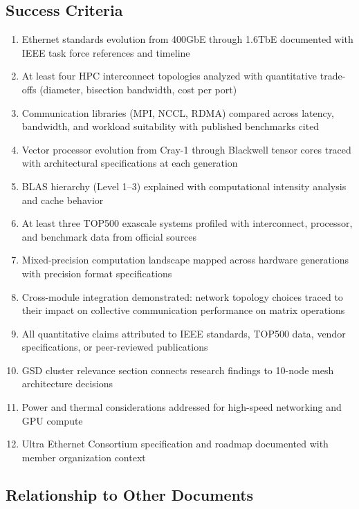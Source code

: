 \documentclass[11pt,letterpaper]{article}
\begin{document}
\subsection{Success Criteria}

\begin{enumerate}[leftmargin=2em]
\item Ethernet standards evolution from 400GbE through 1.6TbE documented with IEEE task force references and timeline
\item At least four HPC interconnect topologies analyzed with quantitative trade-offs (diameter, bisection bandwidth, cost per port)
\item Communication libraries (MPI, NCCL, RDMA) compared across latency, bandwidth, and workload suitability with published benchmarks cited
\item Vector processor evolution from Cray-1 through Blackwell tensor cores traced with architectural specifications at each generation
\item BLAS hierarchy (Level 1--3) explained with computational intensity analysis and cache behavior
\item At least three TOP500 exascale systems profiled with interconnect, processor, and benchmark data from official sources
\item Mixed-precision computation landscape mapped across hardware generations with precision format specifications
\item Cross-module integration demonstrated: network topology choices traced to their impact on collective communication performance on matrix operations
\item All quantitative claims attributed to IEEE standards, TOP500 data, vendor specifications, or peer-reviewed publications
\item GSD cluster relevance section connects research findings to 10-node mesh architecture decisions
\item Power and thermal considerations addressed for high-speed networking and GPU compute
\item Ultra Ethernet Consortium specification and roadmap documented with member organization context
\end{enumerate}

\subsection{Relationship to Other Documents}
\end{document}
